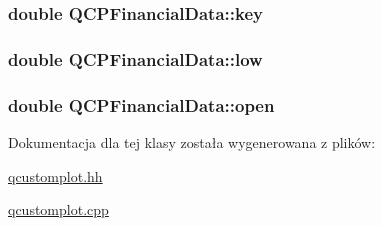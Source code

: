 \subsubsection[{\texorpdfstring{key}{key}}]{\setlength{\rightskip}{0pt plus 5cm}double Q\+C\+P\+Financial\+Data\+::key}\hypertarget{class_q_c_p_financial_data_a18bc92126f28c214b05b0161e5f5958b}{}\label{class_q_c_p_financial_data_a18bc92126f28c214b05b0161e5f5958b}
\subsubsection[{\texorpdfstring{low}{low}}]{\setlength{\rightskip}{0pt plus 5cm}double Q\+C\+P\+Financial\+Data\+::low}\hypertarget{class_q_c_p_financial_data_aecce0fb45a115e3f3a25eea78491ac16}{}\label{class_q_c_p_financial_data_aecce0fb45a115e3f3a25eea78491ac16}
\subsubsection[{\texorpdfstring{open}{open}}]{\setlength{\rightskip}{0pt plus 5cm}double Q\+C\+P\+Financial\+Data\+::open}\hypertarget{class_q_c_p_financial_data_a3059e1e1fbcb9fd243fde0450f238032}{}\label{class_q_c_p_financial_data_a3059e1e1fbcb9fd243fde0450f238032}


Dokumentacja dla tej klasy została wygenerowana z plików\+:\begin{DoxyCompactItemize}
\item 
\hyperlink{qcustomplot_8hh}{qcustomplot.\+hh}\item 
\hyperlink{qcustomplot_8cpp}{qcustomplot.\+cpp}\end{DoxyCompactItemize}
